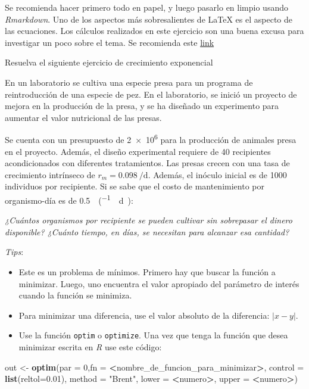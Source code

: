 \documentclass[12pt,letterpaper,]{book}
\newenvironment{Shaded}{\begin{snugshade}}{\end{snugshade}}
\newcommand{\KeywordTok}[1]{\textcolor[rgb]{0.13,0.29,0.53}{\textbf{#1}}}
\newcommand{\DataTypeTok}[1]{\textcolor[rgb]{0.13,0.29,0.53}{#1}}
\newcommand{\DecValTok}[1]{\textcolor[rgb]{0.00,0.00,0.81}{#1}}
\newcommand{\FloatTok}[1]{\textcolor[rgb]{0.00,0.00,0.81}{#1}}
\newcommand{\StringTok}[1]{\textcolor[rgb]{0.31,0.60,0.02}{#1}}
\newcommand{\OperatorTok}[1]{\textcolor[rgb]{0.81,0.36,0.00}{\textbf{#1}}}
\newcommand{\NormalTok}[1]{#1}
\let\BeginKnitrBlock\begin \let\EndKnitrBlock\end
\begin{document}
Se recomienda hacer primero todo en papel, y luego pasarlo en limpio
usando \emph{Rmarkdown}. Uno de los aspectos más sobresalientes de LaTeX
es el aspecto de las ecuaciones. Los cálculos realizados en este
ejercicio son una buena excusa para investigar un poco sobre el tema. Se
recomienda este
\href{https://en.wikibooks.org/wiki/LaTeX/Mathematics}{link}

\setcounter{exercise}{0}

\BeginKnitrBlock{exercise}
\protect\hypertarget{exr:T02E01}{}{\label{exr:T02E01} }Resuelva el siguiente
ejercicio de crecimiento exponencial
\EndKnitrBlock{exercise}

En un laboratorio se cultiva una especie presa para un programa de
reintroducción de una especie de pez. En el laboratorio, se inició un
proyecto de mejora en la producción de la presa, y se ha diseñado un
experimento para aumentar el valor nutricional de las presas.

Se cuenta con un presupuesto de \SI{2e6}{} para la producción
de animales presa en el proyecto. Además, el diseño experimental
requiere de 40 recipientes acondicionados con diferentes tratamientos.
Las presas crecen con una tasa de crecimiento intrínseco de
\(r_m = \SI{0.098}{\per\day}\). Además, el inóculo inicial es de
\num{1000} individuos por recipiente. Si se sabe que el costo de
mantenimiento por organismo-día es de
\SI{0.5}{\per(.\day)}:

\emph{¿Cuántos organismos por recipiente se pueden cultivar sin
sobrepasar el dinero disponible? ¿Cuánto tiempo, en días, se necesitan
para alcanzar esa cantidad?}

\emph{Tips}:

\begin{itemize}
\item
  Este es un problema de mínimos. Primero hay que buscar la función a
  minimizar. Luego, uno encuentra el valor apropiado del parámetro de
  interés cuando la función se minimiza.
\item
  Para minimizar una diferencia, use el valor absoluto de la diferencia:
  \(\left| x - y\right|\).
\item
  Use la función \texttt{optim} o \texttt{optimize}. Una vez que tenga
  la función que desea minimizar escrita en \emph{R} use este código:
\end{itemize}

\begin{Shaded}
\begin{Highlighting}[]
\NormalTok{out <-}\StringTok{ }\KeywordTok{optim}\NormalTok{(}\DataTypeTok{par =} \DecValTok{0}\NormalTok{,}\DataTypeTok{fn =} \OperatorTok{<}\NormalTok{nombre_de_funcion_para_minimizar}\OperatorTok{>}\NormalTok{,}
      \DataTypeTok{control =} \KeywordTok{list}\NormalTok{(}\DataTypeTok{reltol=}\FloatTok{0.01}\NormalTok{),}
      \DataTypeTok{method =} \StringTok{"Brent"}\NormalTok{, }
      \DataTypeTok{lower =} \OperatorTok{<}\NormalTok{numero}\OperatorTok{>}\NormalTok{, }
      \DataTypeTok{upper =} \OperatorTok{<}\NormalTok{numero}\OperatorTok{>}\NormalTok{)}
\end{Highlighting}
\end{Shaded}
\end{document}
